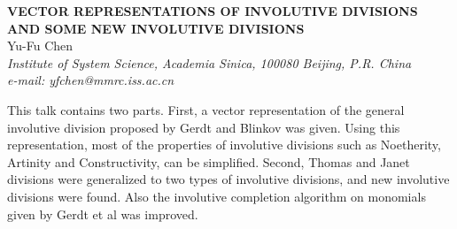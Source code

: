 \documentclass[11pt, draft]{article}
\begin{document}

\begin{center}
{\bf
VECTOR REPRESENTATIONS OF INVOLUTIVE DIVISIONS
       AND SOME NEW INVOLUTIVE DIVISIONS
}\\
\vspace {0.3cm}
{Yu-Fu Chen}\\
{\it \small Institute of System Science, Academia Sinica, 100080 Beijing,
P.R. China \\
e-mail: yfchen@mmrc.iss.ac.cn}
\end{center}
\vspace {0.6cm}
This talk contains two parts. First, a vector representation
of the general involutive division proposed by Gerdt and Blinkov was given.
Using this representation, most of the properties of involutive divisions
such as Noetherity, Artinity and Constructivity, can be simplified. Second,
Thomas and Janet divisions were generalized to two types of involutive
divisions, and new involutive divisions were found. Also the involutive
completion algorithm on monomials given by Gerdt et al was improved.
\end{document}
